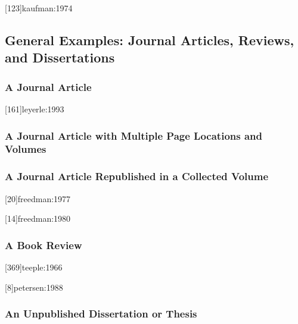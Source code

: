 \documentclass[a4paper]{article}
\begin{document}
[123]{kaufman:1974}

\subsection{General Examples: Journal Articles, Reviews, and Dissertations}

\subsubsection{A Journal Article}

[161]{leyerle:1993}

\subsubsection{A Journal Article with Multiple Page Locations and Volumes}



\subsubsection{A Journal Article Republished in a Collected Volume}

[20]{freedman:1977}

[14]{freedman:1980}

\subsubsection{A Book Review}

[369]{teeple:1966}


[8]{petersen:1988}

\subsubsection{An Unpublished Dissertation or Thesis}
\end{document}
